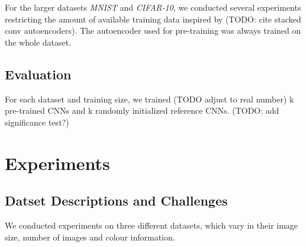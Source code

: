 \documentclass{article}
\begin{document}
    For the larger datasets \emph{MNIST} and \emph{CIFAR-10}, we conducted several experiments restricting the amount of available training data inspired by (TODO: cite stacked conv autoencoders). The autoencoder used for pre-training was always trained on the whole dataset. 


  \subsection{Evaluation}
    For each dataset and training size, we trained (TODO adjust to real number) k pre-trained CNNs and k randomly initialized reference CNNs. (TODO: add significance test?)
  

\section{Experiments}

  \subsection{Datset Descriptions and Challenges}
  We conducted experiments on three different datasets, which vary in their image size, number of images and colour information.
\end{document}
